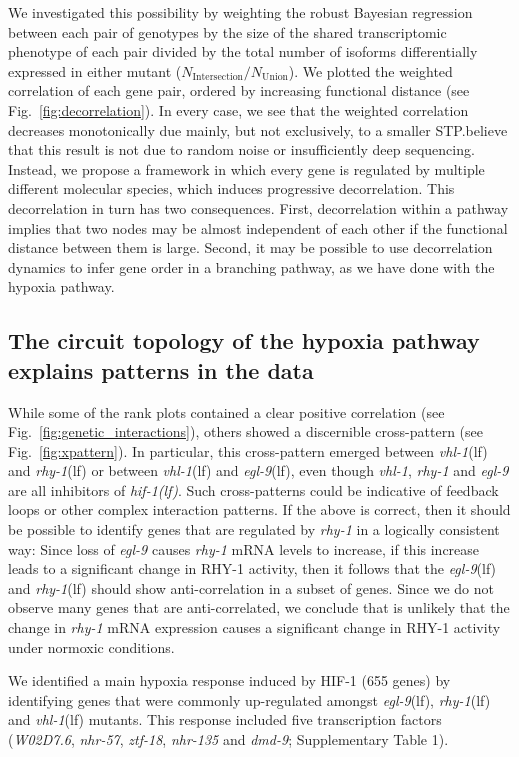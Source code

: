 \documentclass[9pt,twocolumn,twoside,lineno]{pnas-new}
\newcommand{\gene}[1]{\mbox{\emph{#1}}}
\newcommand{\nhr}{\gene{nhr-57}}
\newcommand{\egl}{\gene{egl-9}(lf)}
\newcommand{\rhy}{\gene{rhy-1}(lf)}
\newcommand{\vhl}{\gene{vhl-1}(lf)}
\newcommand{\hif}{\gene{hif-1(lf)}}
\begin{document}
We investigated this possibility by weighting the robust Bayesian regression
between each pair of genotypes by the size of the shared transcriptomic
phenotype of each pair divided by the total number of isoforms differentially
expressed in either mutant ($N_\mathrm{Intersection}/N_{\mathrm{Union}}$). We
plotted the weighted correlation of each gene pair, ordered by increasing
functional distance (see Fig.~\ref{fig:decorrelation}). In every case, we see
that the weighted correlation decreases monotonically due mainly, but not
exclusively, to a smaller STP.\@We believe that this result is not due to random
noise or insufficiently deep sequencing. Instead, we propose a framework in
which every gene is regulated by multiple different molecular species, which
induces progressive decorrelation. This decorrelation in turn has two
consequences. First, decorrelation within a pathway implies that two nodes may
be almost independent of each other if the functional distance between them is
large. Second, it may be possible to use decorrelation dynamics to infer gene
order in a branching pathway, as we have done with the hypoxia pathway.

\subsection*{The circuit topology of the hypoxia pathway explains patterns in
            the data}
\label{sub:topology}
While some of the rank plots contained a clear positive
correlation (see Fig.~\ref{fig:genetic_interactions}), others showed a
discernible cross-pattern (see Fig.~\ref{fig:xpattern}). In particular, this
cross-pattern emerged between \vhl{} and \rhy{} or between \vhl{} and \egl{},
even though \gene{vhl-1}, \gene{rhy-1} and \gene{egl-9} are all
inhibitors of \hif{}. Such cross-patterns could be indicative of feedback loops
or other complex interaction patterns.
If the above is correct, then it should be possible to identify genes that are
regulated by \gene{rhy-1} in a logically consistent way: Since loss of
\gene{egl-9} causes \gene{rhy-1} mRNA levels to increase, if this increase leads
to a significant change in RHY-1 activity, then it follows that the \egl{} and
\rhy{} should show anti-correlation in a subset of genes.
Since we do not observe many genes that are anti-correlated, we conclude that is
unlikely that the change in \gene{rhy-1} mRNA expression causes a significant
change in RHY-1 activity under normoxic conditions.

We identified a main hypoxia response induced by HIF-1 (655 genes) by
identifying genes that were commonly up-regulated amongst \egl{}, \rhy{} and
\vhl{} mutants. This response included five transcription factors
(\gene{W02D7.6}, \nhr{}, \gene{ztf-18}, \gene{nhr-135} and \gene{dmd-9};
Supplementary Table 1).
\end{document}
